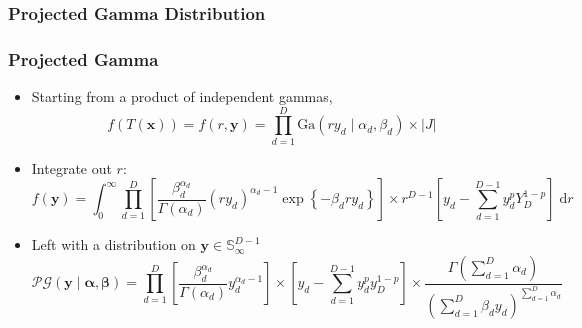 \documentclass[aspectratio=169,10pt]{beamer}
\begin{document}
\subsubsection{Projected Gamma Distribution}

\begin{frame}
    \frametitle{Projected Gamma}
    \label{pgpareto:projectedgamma}
    \begin{itemize}
    \item Starting from a product of independent gammas,
        \[
        f\left(T(\bm{x})\right) = f(r,\bm{y}) = \prod_{d = 1}^D
            \text{Ga}(ry_d\mid\alpha_d,\beta_d)\times \lvert J \rvert
        \]
    \item Integrate out $r$:
        \[
        f(\bm{y}) = \int_{0}^{\infty}
            \prod_{d = 1}^D\left[\frac{\beta_d^{\alpha_d}}{\Gamma(\alpha_d)}
            (ry_d)^{\alpha_d - 1}
            \exp\left\lbrace-\beta_dry_d\right\rbrace\right] \times 
            r^{D-1}\left[y_d - \sum_{d = 1}^{D-1}y_d^pY_D^{1-p}\right]
            \;\text{d}r
        \]
    \item Left with a distribution on $\bm{y} \in \mathbb{S}_{\infty}^{D-1}$
    \[
    \mathcal{PG}(\bm{y}\mid\bm{\alpha},\bm{\beta}) = 
        \prod_{d = 1}^D\left[\frac{\beta_d^{\alpha_d}}{\Gamma(\alpha_d)}
            y_d^{\alpha_d - 1}\right]
        \times \left[y_d - \sum_{d = 1}^{D-1}y_d^py_D^{1-p}\right]
        \times \frac{\Gamma(\sum_{d = 1}^D\alpha_d)}{
            \left(\sum_{d = 1}^{D}\beta_dy_d\right)^{\sum_{d = 1}^D\alpha_d}}
    \]
    \end{itemize}
    \hyperlink{pgpareto:projgammainference}{}
\end{frame} %
\end{document}
